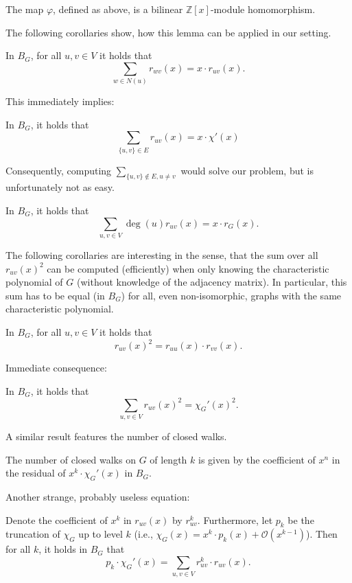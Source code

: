 \documentclass[a4paper,12pt]{article}
\begin{document}
\begin{lemma}
The map $\varphi$, defined as above, is a bilinear $\mathbb{Z}[x]$-module homomorphism.
\end{lemma}

The following corollaries show, how this lemma can be applied in our setting.

\begin{cor}
In $B_G$, for all $u,v\in V$ it holds that
$$
\sum_{w\in N(u)}r_{wv}(x) = x \cdot r_{uv}(x).
$$
\end{cor}
This immediately implies:
\begin{cor}
In $B_G$, it holds that
$$
\sum_{\{u,v\}\in E}r_{uv}(x) = x\cdot\chi'(x)
$$
\end{cor}

Consequently, computing $\sum_{\{u,v\}\notin E, u \neq v}$ would solve our problem, but is unfortunately not as easy.

\begin{cor}
In $B_G$, it holds that
$$
\sum_{u,v \in V} \deg(u)r_{uv}(x) = x \cdot r_G(x).
$$
\end{cor}

The following corollaries are interesting in the sense, that the sum over all $r_{uv}(x)^2$ can be computed (efficiently) when only knowing the characteristic polynomial of $G$ (without knowledge of the adjacency matrix). In particular, this sum has to be equal (in $B_G$) for all, even non-isomorphic, graphs with the same characteristic polynomial.

\begin{cor}
In $B_G$, for all $u,v \in V$ it holds that
$$
r_{uv}(x)^2 = r_{uu}(x) \cdot r_{vv}(x).
$$
\end{cor}

Immediate consequence:

\begin{cor}
In $B_G$, it holds that
$$
\sum_{u,v\in V}r_{uv}(x)^2 = \chi_G'(x)^2.
$$
\end{cor}

A similar result features the number of closed walks.

\begin{cor}
The number of closed walks on $G$ of length $k$ is given by the coefficient of $x^n$ in the residual of $x^k \cdot \chi_G'(x)$ in $B_G$.
\end{cor}

Another strange, probably useless equation:

\begin{cor}
Denote the coefficient of $x^k$ in $r_{uv}(x)$ by $r_{uv}^k$. Furthermore, let $p_k$ be the truncation of $\chi_G$ up to level $k$ (i.e., $\chi_G(x) = x^k \cdot p_k(x) + \mathcal{O}(x^{k-1})$). Then for all $k$, it holds in $B_G$ that
$$
p_k \cdot \chi_G'(x) = \sum_{u,v\in V}r_{uv}^k \cdot r_{uv}(x).
$$
\end{cor}
\end{document}
